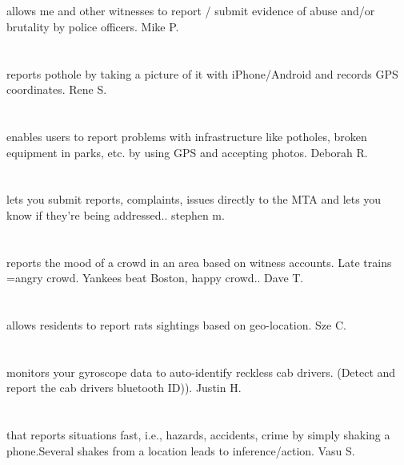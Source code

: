 \section{}allows me and other witnesses to report / submit evidence of abuse and/or brutality by police officers. Mike P.
\section{}reports pothole by taking a picture of it with iPhone/Android and records GPS coordinates. Rene S.
\section{}enables users to report problems with infrastructure like potholes,  broken equipment in parks,  etc. by using GPS and accepting photos. Deborah R.
\section{}lets you submit reports,  complaints,  issues directly to the MTA and lets you know if they're being addressed.. stephen m.
\section{}reports the mood of a crowd in an area based on witness accounts. Late trains =angry crowd. Yankees beat Boston,  happy crowd.. Dave T.
\section{}allows residents to report rats sightings based on geo-location. Sze C.
\section{}monitors your gyroscope data to auto-identify reckless cab drivers. (Detect and report the cab drivers bluetooth ID)). Justin H.
\section{}that reports situations fast, i.e., hazards, accidents, crime by simply shaking a phone.Several shakes from a location leads to inference/action. Vasu S.

